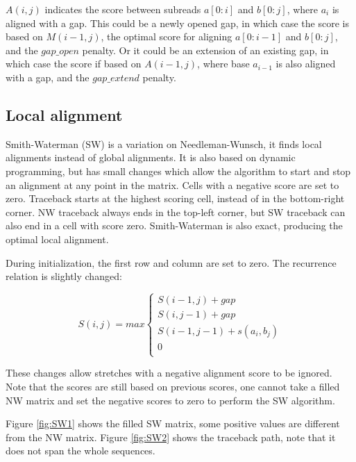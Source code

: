 \documentclass[../main/thesis.tex]{subfiles}
\begin{document}
$A(i,j)$ indicates the score between subreads $a[0:i]$ and $b[0:j]$, where $a_i$ is aligned with a gap.
This could be a newly opened gap, in which case the score is based on $M(i-1,j)$, the optimal score for aligning $a[0:i-1]$ and $b[0:j]$, and the $gap\_open$ penalty.
Or it could be an extension of an existing gap, in which case the score if based on $A(i-1,j)$, where base $a_{i-1}$ is also aligned with a gap, and the $gap\_extend$ penalty.


\subsection{Local alignment}
Smith-Waterman (SW)\cite{SW} is a variation on Needleman-Wunsch, it finds local alignments instead of global alignments.
It is also based on dynamic programming, but has small changes which allow the algorithm to start and stop an alignment at any point in the matrix.
Cells with a negative score are set to zero.
Traceback starts at the highest scoring cell, instead of in the bottom-right corner.
NW traceback always ends in the top-left corner, but SW traceback can also end in a cell with score zero.
Smith-Waterman is also exact, producing the optimal local alignment.

During initialization, the first row and column are set to zero.
The recurrence relation is slightly changed:

\begin{equation}
S(i,j) = max
\begin{cases}
S(i-1,j) + gap \\
S(i,j-1) + gap \\
S(i-1,j-1) + s(a_i,b_j) \\
0 \\
\end{cases}
\label{eq:NW_recursion}
\end{equation}

These changes allow stretches with a negative alignment score to be ignored.
Note that the scores are still based on previous scores, one cannot take a filled NW matrix and set the negative scores to zero to perform the SW algorithm.

Figure \ref{fig:SW1} shows the filled SW matrix, some positive values are different from the NW matrix.
Figure \ref{fig:SW2} shows the traceback path, note that it does not span the whole sequences.

\end{document}
